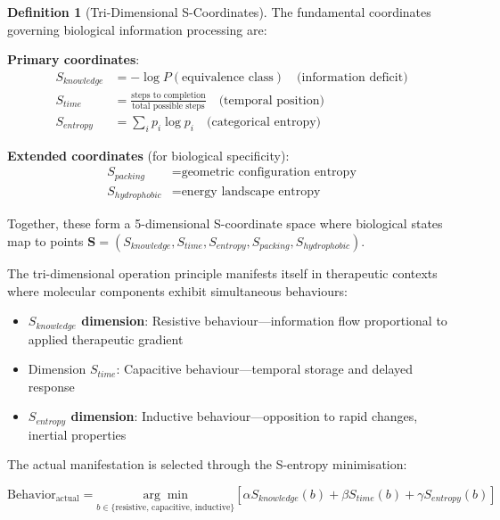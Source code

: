 \documentclass{article}
\theoremstyle{definition}
\newtheorem{definition}[theorem]{Definition}
\theoremstyle{remark}
\begin{document}
\begin{definition}[Tri-Dimensional S-Coordinates]
The fundamental coordinates governing biological information processing are:

\textbf{Primary coordinates}:
\begin{align}
S_{knowledge} &= -\log P(\text{equivalence class}) \quad \text{(information deficit)} \\
S_{time} &= \frac{\text{steps to completion}}{\text{total possible steps}} \quad \text{(temporal position)} \\
S_{entropy} &= \sum_{i} p_i \log p_i \quad \text{(categorical entropy)}
\end{align}

\textbf{Extended coordinates} (for biological specificity):
\begin{align}
S_{packing} &= \text{geometric configuration entropy} \\
S_{hydrophobic} &= \text{energy landscape entropy}
\end{align}

Together, these form a 5-dimensional S-coordinate space where biological states map to points $\mathbf{S} = (S_{knowledge}, S_{time}, S_{entropy}, S_{packing}, S_{hydrophobic})$.
\end{definition}

The tri-dimensional operation principle manifests itself in therapeutic contexts where molecular components exhibit simultaneous behaviours:

\begin{itemize}
\item \textbf{$S_{knowledge}$ dimension}: Resistive behaviour—information flow proportional to applied therapeutic gradient
\item Dimension \textbf{$S_{time}$}: Capacitive behaviour—temporal storage and delayed response
\item \textbf{$S_{entropy}$ dimension}: Inductive behaviour—opposition to rapid changes, inertial properties
\end{itemize}

The actual manifestation is selected through the S-entropy minimisation:

\begin{equation}
\text{Behavior}_{\text{actual}} = \underset{b \in \{\text{resistive, capacitive, inductive}\}}{\arg\min} \left[ \alpha S_{knowledge}(b) + \beta S_{time}(b) + \gamma S_{entropy}(b) \right]
\label{eq:tri_dimensional_selection}
\end{equation}
\end{document}
